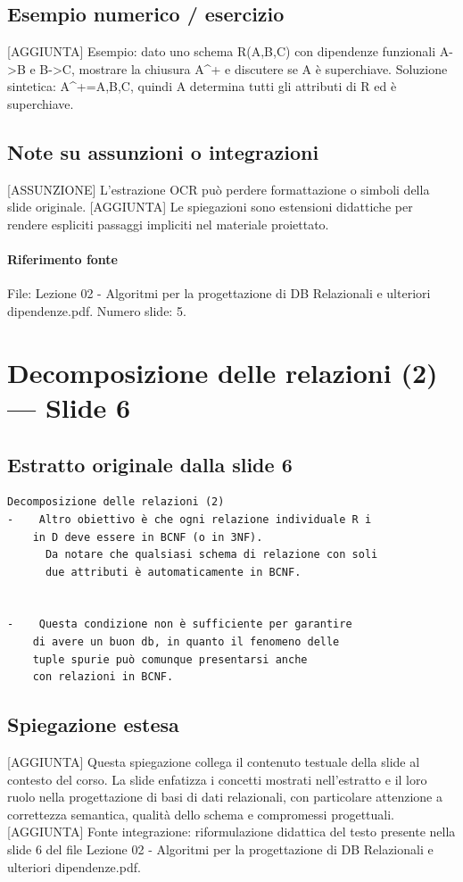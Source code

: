 \documentclass[11pt]{article}
\begin{document}
\subsection*{Esempio numerico / esercizio}
[AGGIUNTA] Esempio: dato uno schema R(A,B,C) con dipendenze funzionali A->B e B->C, mostrare la chiusura A^+ e discutere se A è superchiave. Soluzione sintetica: A^+={A,B,C}, quindi A determina tutti gli attributi di R ed è superchiave.
\subsection*{Note su assunzioni o integrazioni}
[ASSUNZIONE] L'estrazione OCR può perdere formattazione o simboli della slide originale.
[AGGIUNTA] Le spiegazioni sono estensioni didattiche per rendere espliciti passaggi impliciti nel materiale proiettato.
\paragraph{Riferimento fonte} File: Lezione 02 - Algoritmi per la progettazione di DB Relazionali e ulteriori dipendenze.pdf. Numero slide: 5.
\section{Decomposizione delle relazioni (2) --- Slide 6}
\subsection*{Estratto originale dalla slide 6}
\begin{lstlisting}
Decomposizione delle relazioni (2)
-    Altro obiettivo è che ogni relazione individuale R i
    in D deve essere in BCNF (o in 3NF).
      Da notare che qualsiasi schema di relazione con soli
      due attributi è automaticamente in BCNF.


-    Questa condizione non è sufficiente per garantire
    di avere un buon db, in quanto il fenomeno delle
    tuple spurie può comunque presentarsi anche
    con relazioni in BCNF.
\end{lstlisting}
\subsection*{Spiegazione estesa}
[AGGIUNTA] Questa spiegazione collega il contenuto testuale della slide al contesto del corso. La slide enfatizza i concetti mostrati nell'estratto e il loro ruolo nella progettazione di basi di dati relazionali, con particolare attenzione a correttezza semantica, qualità dello schema e compromessi progettuali.
[AGGIUNTA] Fonte integrazione: riformulazione didattica del testo presente nella slide 6 del file Lezione 02 - Algoritmi per la progettazione di DB Relazionali e ulteriori dipendenze.pdf.
\end{document}
